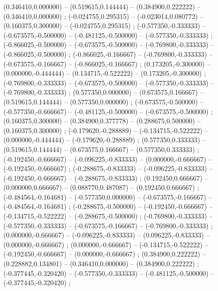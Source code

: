    (0.346410,0.000000) -- (0.519615,0.144444) -- (0.384900,0.222222) -- (0.346410,0.000000) ;
   (-0.024755,0.295315) -- (-0.023014,0.080772) -- (0.160375,0.300000) -- (-0.024755,0.295315) ;
   (-0.577350,-0.333333) -- (-0.673575,-0.500000) -- (-0.481125,-0.500000) -- (-0.577350,-0.333333) ;
   (-0.866025,-0.500000) -- (-0.673575,-0.500000) -- (-0.769800,-0.333333) -- (-0.866025,-0.500000) ;
   (-0.866025,-0.166667) -- (-0.769800,-0.333333) -- (-0.673575,-0.166667) -- (-0.866025,-0.166667) ;
   (0.173205,-0.300000) -- (0.000000,-0.444444) -- (0.134715,-0.522222) -- (0.173205,-0.300000) ;
   (-0.769800,-0.333333) -- (-0.673575,-0.500000) -- (-0.577350,-0.333333) -- (-0.769800,-0.333333) ;
   (0.577350,0.000000) -- (0.673575,0.166667) -- (0.519615,0.144444) -- (0.577350,0.000000) ;
   (-0.673575,-0.500000) -- (-0.577350,-0.666667) -- (-0.481125,-0.500000) -- (-0.673575,-0.500000) ;
   (0.160375,0.300000) -- (0.384900,0.377778) -- (0.288675,0.500000) -- (0.160375,0.300000) ;
   (-0.179620,-0.288889) -- (-0.134715,-0.522222) -- (0.000000,-0.444444) -- (-0.179620,-0.288889) ;
   (0.577350,0.333333) -- (0.519615,0.144444) -- (0.673575,0.166667) -- (0.577350,0.333333) ;
   (-0.192450,-0.666667) -- (-0.096225,-0.833333) -- (0.000000,-0.666667) -- (-0.192450,-0.666667) ;
   (-0.288675,-0.833333) -- (-0.096225,-0.833333) -- (-0.192450,-0.666667) -- (-0.288675,-0.833333) ;
   (0.192450,0.666667) -- (0.000000,0.666667) -- (0.088770,0.487087) -- (0.192450,0.666667) ;
   (-0.484564,-0.164681) -- (-0.577350,0.000000) -- (-0.673575,-0.166667) -- (-0.484564,-0.164681) ;
   (-0.288675,-0.500000) -- (-0.192450,-0.666667) -- (-0.134715,-0.522222) -- (-0.288675,-0.500000) ;
   (-0.769800,-0.333333) -- (-0.577350,-0.333333) -- (-0.673575,-0.166667) -- (-0.769800,-0.333333) ;
   (0.000000,-0.666667) -- (-0.096225,-0.833333) -- (0.096225,-0.833333) -- (0.000000,-0.666667) ;
   (0.000000,-0.666667) -- (-0.134715,-0.522222) -- (-0.192450,-0.666667) -- (0.000000,-0.666667) ;
   (0.384900,0.222222) -- (0.228882,0.134801) -- (0.346410,0.000000) -- (0.384900,0.222222) ;
   (-0.377445,-0.320420) -- (-0.577350,-0.333333) -- (-0.481125,-0.500000) -- (-0.377445,-0.320420) ;
